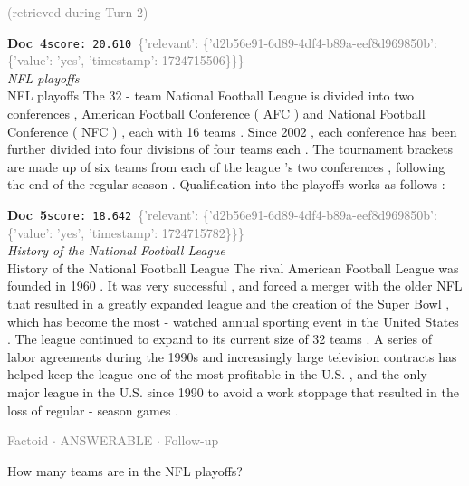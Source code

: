 \documentclass[a4paper,11pt]{article}
\begin{document}
\hfill{\tiny\textcolor{gray}{(retrieved during Turn 2)}}
\begin{docenv}
{\footnotesize\textcolor{doccolor}{\textbf{Doc~4}}}\hfill{\tiny\texttt{score:~20.610}}\ {\tiny\textcolor{gray}{\{'relevant': \{'d2b56e91-6d89-4df4-b89a-eef8d969850b': \{'value': 'yes', 'timestamp': 1724715506\}\}\}}}\\[3pt]
{\small\textit{NFL playoffs}}\\[2pt]
\vspace{2pt}
{\footnotesize NFL playoffs
The 32 - team National Football League is divided into two conferences , American Football Conference ( AFC ) and National Football Conference ( NFC ) , each with 16 teams . Since 2002 , each conference has been further divided into four divisions of four teams each . The tournament brackets are made up of six teams from each of the league 's two conferences , following the end of the regular season . Qualification into the playoffs works as follows :}
\end{docenv}
\begin{docenv}
{\footnotesize\textcolor{doccolor}{\textbf{Doc~5}}}\hfill{\tiny\texttt{score:~18.642}}\ {\tiny\textcolor{gray}{\{'relevant': \{'d2b56e91-6d89-4df4-b89a-eef8d969850b': \{'value': 'yes', 'timestamp': 1724715782\}\}\}}}\\[3pt]
{\small\textit{History of the National Football League}}\\[2pt]
\vspace{2pt}
{\footnotesize History of the National Football League
The rival American Football League was founded in 1960 . It was very successful , and forced a merger with the older NFL that resulted in a greatly expanded league and the creation of the Super Bowl , which has become the most - watched annual sporting event in the United States . The league continued to expand to its current size of 32 teams . A series of labor agreements during the 1990s and increasingly large television contracts has helped keep the league one of the most profitable in the U.S. , and the only major league in the U.S. since 1990 to avoid a work stoppage that resulted in the loss of regular - season games .}
\end{docenv}
\vspace{0.5em}
\hfill{\tiny\textcolor{gray}{Factoid $\cdot$ ANSWERABLE $\cdot$ Follow-up}}
\begin{userbubble}
How many teams are in the NFL playoffs?
\end{userbubble}
\end{document}

